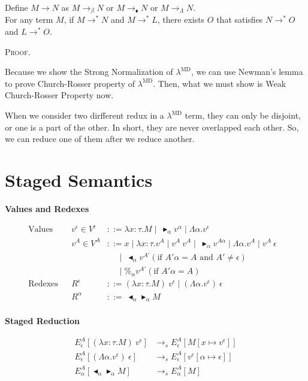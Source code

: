 \documentclass[9pt, a4paper]{extarticle}
\theoremstyle{break}
\newcommand{\figheader}[2]{
  \begin{flushleft}
    #2 {\bf \normalsize #1}
\end{flushleft}}
\newcommand{\TB}{\blacktriangleright}
\newcommand{\TBL}{\blacktriangleleft}
\begin{document}
\begin{thm}
    Define $M \longrightarrow N$ as $M \longrightarrow_{\beta} N$ or $M\longrightarrow_\blacklozenge N$ or  $M \longrightarrow_{\Lambda} N$.\\
    For any term $M$, if $M \longrightarrow^* N$ and $M \longrightarrow^* L$,
    there exists $O$ that satisfies $N \longrightarrow^* O$ and $L \longrightarrow^* O$.
\end{thm}

\textsc{Proof.}

Because we show the Strong Normalization of $\lambda^{\text{MD}}$, we can use Newman's lemma to prove Church-Rosser property of $\lambda^{\text{MD}}$.
Then, what we must show is Weak Church-Rosser Property now.

When we consider two dirfferent redux in a $\lambda^{\text{MD}}$ term, they can only be disjoint, or one is a part of the other.
In short, they are never overlapped each other.
So, we can reduce one of them after we reduce another.

\section{ Staged Semantics }

\figheader{Values and Redexes}{}

\begin{align*}
    \textrm{Values} && v^\epsilon \in V^\epsilon & ::= \lambda x:\tau.M \mid\ \TB_\alpha v^\alpha \mid \Lambda\alpha.v^\epsilon & \\
                    && v^A \in V^A & ::= x \mid \lambda x:\tau.v^A \mid v^A\ v^A \mid\ \TB_\alpha v^{A\alpha} 
                                           \mid \Lambda\alpha.v^A \mid v^A\ \epsilon &\\
                                    &&& \quad\   \mid\ \TBL_\alpha v^{A'} (\text{if } A'\alpha = A \text{ and } A' \neq \epsilon) & \\
                                    &&& \quad\   \mid \%_\alpha v^{A'} (\text{if } A'\alpha = A) & \\
    \textrm{Redexes} && R^\epsilon & ::= (\lambda x:\tau.M)\ v^\epsilon \mid (\Lambda\alpha.v^\epsilon)\ \epsilon & \\
                     && R^\alpha & ::=\ \TBL_\alpha \TB_\alpha M & \\
\end{align*}

\figheader{Staged Reduction}{}
\begin{align*}
    E^A_\epsilon [(\lambda x:\tau.M)\ v^\epsilon] & \longrightarrow_s E^A_\epsilon[M[x\mapsto v^\epsilon]] \\
    E^A_\epsilon [(\Lambda\alpha.v^\epsilon)\ \epsilon] & \longrightarrow_s E^A_\epsilon[v^\epsilon[\alpha\mapsto \epsilon]] \\
    E^A_\alpha [\TBL_\alpha \TB_\alpha M] & \longrightarrow_s E^A_\alpha[M] \\
\end{align*}
\end{document}
